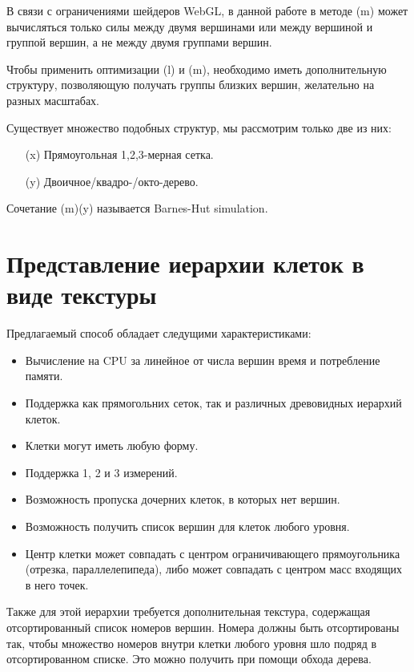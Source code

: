 В связи с ограничениями шейдеров WebGL, в данной работе в методе (m) может вычисляться только силы между двумя вершинами или между вершиной и группой вершин, а не между двумя группами вершин.

Чтобы применить оптимизации (l) и (m), необходимо иметь дополнительную структуру, позволяющую получать группы близких вершин, желательно на разных масштабах.

Существует множество подобных структур, мы рассмотрим только две из них:

\begin{itemize}
\item[(x)] Прямоугольная 1,2,3-мерная сетка.
\item[(y)] Двоичное/квадро-/окто-дерево.
\end{itemize}

Сочетание (m)(y) называется Barnes-Hut simulation.

\section{Представление иерархии клеток в виде текстуры}

\label{sec:struct_texture}

Предлагаемый способ обладает следущими характеристиками:

\begin{itemize}
\item Вычисление на CPU за линейное от числа вершин время и потребление памяти.
\item Поддержка как прямогольних сеток, так и различных древовидных иерархий клеток.
\item Клетки могут иметь любую форму.
\item Поддержка 1, 2 и 3 измерений.
\item Возможность пропуска дочерних клеток, в которых нет вершин.
\item Возможность получить список вершин для клеток любого уровня.
\item Центр клетки может совпадать с центром ограничивающего прямоугольника (отрезка, параллелепипеда), либо может совпадать с центром масс входящих в него точек.
\end{itemize}

Также для этой иерархии требуется дополнительная текстура, содержащая отсортированный список номеров вершин. Номера должны быть отсортированы так, чтобы множество номеров внутри клетки любого уровня шло подряд в отсортированном списке. Это можно получить при помощи обхода дерева.

